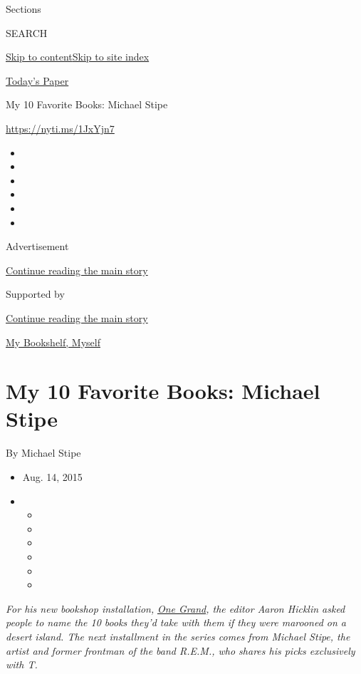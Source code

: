 Sections

SEARCH

\protect\hyperlink{site-content}{Skip to
content}\protect\hyperlink{site-index}{Skip to site index}

\href{https://myaccount.nytimes3xbfgragh.onion/auth/login?response_type=cookie\&client_id=vi}{}

\href{https://www.nytimes3xbfgragh.onion/section/todayspaper}{Today's
Paper}

My 10 Favorite Books: Michael Stipe

\url{https://nyti.ms/1JxYjn7}

\begin{itemize}
\item
\item
\item
\item
\item
\item
\end{itemize}

Advertisement

\protect\hyperlink{after-top}{Continue reading the main story}

Supported by

\protect\hyperlink{after-sponsor}{Continue reading the main story}

\href{/column/my-bookshelf-myself}{My Bookshelf, Myself}

\hypertarget{my-10-favorite-books-michael-stipe}{%
\section{My 10 Favorite Books: Michael
Stipe}\label{my-10-favorite-books-michael-stipe}}

By Michael Stipe

\begin{itemize}
\item
  Aug. 14, 2015
\item
  \begin{itemize}
  \item
  \item
  \item
  \item
  \item
  \item
  \end{itemize}
\end{itemize}

\emph{For his new bookshop installation,}
\href{http://onegrandbooks.com/}{\emph{One Grand}}\emph{, the editor
Aaron Hicklin asked people to name the 10 books they'd take with them if
they were marooned on a desert island. The next installment in the
series comes from Michael Stipe, the artist and former frontman of the
band R.E.M., who shares his picks exclusively with T.}

